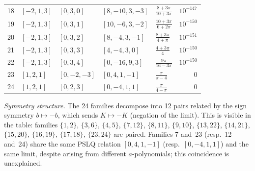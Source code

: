 \documentclass[12pt, reqno]{amsart}
\theoremstyle{definition}
\theoremstyle{remark}
\begin{document}
\begin{table}[htbp]
{\begin{tabular}{r@{\;}l@{\;}l@{\;\;}l@{\;\;}l@{\;\;}r}
18 & $[-2,1,3]$ & $[0,3,0]$ & $[8,-10,3,-3]$
   & $\frac{8+3\pi}{10+3\pi}$ & $10^{-147}$ \\
19 & $[-2,1,3]$ & $[0,3,1]$ & $[10,-6,3,-2]$
   & $\frac{10+3\pi}{6+2\pi}$ & $10^{-150}$ \\
20 & $[-2,1,3]$ & $[0,3,2]$ & $[8,-4,3,-1]$
   & $\frac{8+3\pi}{4+\pi}$ & $10^{-151}$ \\
21 & $[-2,1,3]$ & $[0,3,3]$ & $[4,-4,3,0]$
   & $\frac{4+3\pi}{4}$ & $10^{-150}$ \\
22 & $[-2,1,3]$ & $[0,3,4]$ & $[0,-16,9,3]$
   & $\frac{9\pi}{16-3\pi}$ & $10^{-150}$ \\
23 & $[1,2,1]$ & $[0,-2,-3]$ & $[0,4,1,-1]$
   & $\frac{\pi}{\pi-4}$ & $0$ \\
24 & $[1,2,1]$ & $[0,2,3]$ & $[0,-4,1,1]$
   & $\frac{\pi}{4-\pi}$ & $0$ \\
\hline
\end{tabular}
}
\end{table}

\noindent
\emph{Symmetry structure.}
The 24 families decompose into 12 pairs related by the sign symmetry
$b \mapsto -b$, which sends $K \mapsto -K$ (negation of the limit).
This is visible in the table: families $\{1,2\}$, $\{3,6\}$, $\{4,5\}$,
$\{7,12\}$, $\{8,11\}$, $\{9,10\}$, $\{13,22\}$, $\{14,21\}$, $\{15,20\}$,
$\{16,19\}$, $\{17,18\}$, $\{23,24\}$ are paired.
Families 7 and~23 (resp.\ 12 and~24) share the same PSLQ relation
$[0,4,1,-1]$ (resp.\ $[0,-4,1,1]$) and the same limit, despite arising
from different $a$-polynomials; this coincidence is unexplained.
\end{document}
